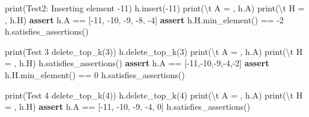 \documentclass[
]{article}
\newenvironment{Shaded}{}{}
\newcommand{\BuiltInTok}[1]{\textcolor[rgb]{0.00,0.50,0.00}{#1}}
\newcommand{\CharTok}[1]{\textcolor[rgb]{0.25,0.44,0.63}{#1}}
\newcommand{\ControlFlowTok}[1]{\textcolor[rgb]{0.00,0.44,0.13}{\textbf{#1}}}
\newcommand{\DecValTok}[1]{\textcolor[rgb]{0.25,0.63,0.44}{#1}}
\newcommand{\NormalTok}[1]{#1}
\newcommand{\OperatorTok}[1]{\textcolor[rgb]{0.40,0.40,0.40}{#1}}
\newcommand{\StringTok}[1]{\textcolor[rgb]{0.25,0.44,0.63}{#1}}
\begin{document}
\begin{Shaded}
\begin{Highlighting}[]
\BuiltInTok{print}\NormalTok{(}\StringTok{\textquotesingle{}Test2: Inserting element {-}11\textquotesingle{}}\NormalTok{)}
\NormalTok{h.insert(}\OperatorTok{{-}}\DecValTok{11}\NormalTok{)}
\BuiltInTok{print}\NormalTok{(}\StringTok{\textquotesingle{}}\CharTok{\textbackslash{}t}\StringTok{ A = \textquotesingle{}}\NormalTok{, h.A)}
\BuiltInTok{print}\NormalTok{(}\StringTok{\textquotesingle{}}\CharTok{\textbackslash{}t}\StringTok{ H = \textquotesingle{}}\NormalTok{, h.H)}
\ControlFlowTok{assert}\NormalTok{ h.A }\OperatorTok{==}\NormalTok{ [}\OperatorTok{{-}}\DecValTok{11}\NormalTok{, }\OperatorTok{{-}}\DecValTok{10}\NormalTok{, }\OperatorTok{{-}}\DecValTok{9}\NormalTok{, }\OperatorTok{{-}}\DecValTok{8}\NormalTok{, }\OperatorTok{{-}}\DecValTok{4}\NormalTok{]}
\ControlFlowTok{assert}\NormalTok{ h.H.min\_element() }\OperatorTok{==} \OperatorTok{{-}}\DecValTok{2}
\NormalTok{h.satisfies\_assertions()}

\BuiltInTok{print}\NormalTok{(}\StringTok{\textquotesingle{}Test 3 delete\_top\_k(3)\textquotesingle{}}\NormalTok{)}
\NormalTok{h.delete\_top\_k(}\DecValTok{3}\NormalTok{)}
\BuiltInTok{print}\NormalTok{(}\StringTok{\textquotesingle{}}\CharTok{\textbackslash{}t}\StringTok{ A = \textquotesingle{}}\NormalTok{, h.A)}
\BuiltInTok{print}\NormalTok{(}\StringTok{\textquotesingle{}}\CharTok{\textbackslash{}t}\StringTok{ H = \textquotesingle{}}\NormalTok{, h.H)}
\NormalTok{h.satisfies\_assertions()}
\ControlFlowTok{assert}\NormalTok{ h.A }\OperatorTok{==}\NormalTok{ [}\OperatorTok{{-}}\DecValTok{11}\NormalTok{,}\OperatorTok{{-}}\DecValTok{10}\NormalTok{,}\OperatorTok{{-}}\DecValTok{9}\NormalTok{,}\OperatorTok{{-}}\DecValTok{4}\NormalTok{,}\OperatorTok{{-}}\DecValTok{2}\NormalTok{]}
\ControlFlowTok{assert}\NormalTok{ h.H.min\_element() }\OperatorTok{==} \DecValTok{0}
\NormalTok{h.satisfies\_assertions()}

\BuiltInTok{print}\NormalTok{(}\StringTok{\textquotesingle{}Test 4 delete\_top\_k(4)\textquotesingle{}}\NormalTok{)}
\NormalTok{h.delete\_top\_k(}\DecValTok{4}\NormalTok{)}
\BuiltInTok{print}\NormalTok{(}\StringTok{\textquotesingle{}}\CharTok{\textbackslash{}t}\StringTok{ A = \textquotesingle{}}\NormalTok{, h.A)}
\BuiltInTok{print}\NormalTok{(}\StringTok{\textquotesingle{}}\CharTok{\textbackslash{}t}\StringTok{ H = \textquotesingle{}}\NormalTok{, h.H)}
\ControlFlowTok{assert}\NormalTok{ h.A }\OperatorTok{==}\NormalTok{ [}\OperatorTok{{-}}\DecValTok{11}\NormalTok{, }\OperatorTok{{-}}\DecValTok{10}\NormalTok{, }\OperatorTok{{-}}\DecValTok{9}\NormalTok{, }\OperatorTok{{-}}\DecValTok{4}\NormalTok{, }\DecValTok{0}\NormalTok{]}
\NormalTok{h.satisfies\_assertions()}


\end{Highlighting}
\end{Shaded}
\end{document}
